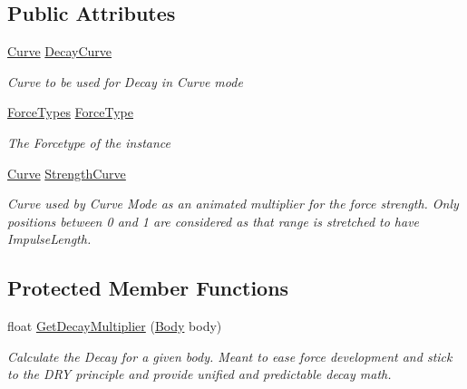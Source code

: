 \subsection*{Public Attributes}
\begin{DoxyCompactItemize}
\item 
\hyperlink{class_microsoft_1_1_xna_1_1_framework_1_1_curve}{Curve} \hyperlink{class_farseer_physics_1_1_controllers_1_1_abstract_force_controller_a6008d9eb0d18504f641b93bb7490bd2b}{Decay\+Curve}
\begin{DoxyCompactList}\small\item\em Curve to be used for Decay in Curve mode \end{DoxyCompactList}\item 
\hyperlink{class_farseer_physics_1_1_controllers_1_1_abstract_force_controller_a2bff9fa57e321530b860a86672a608a1}{Force\+Types} \hyperlink{class_farseer_physics_1_1_controllers_1_1_abstract_force_controller_a107446959131dd903faffb77093d706c}{Force\+Type}
\begin{DoxyCompactList}\small\item\em The Forcetype of the instance \end{DoxyCompactList}\item 
\hyperlink{class_microsoft_1_1_xna_1_1_framework_1_1_curve}{Curve} \hyperlink{class_farseer_physics_1_1_controllers_1_1_abstract_force_controller_a809763f82438ab59503135d9ca4f13b6}{Strength\+Curve}
\begin{DoxyCompactList}\small\item\em Curve used by Curve Mode as an animated multiplier for the force strength. Only positions between 0 and 1 are considered as that range is stretched to have Impulse\+Length. \end{DoxyCompactList}\end{DoxyCompactItemize}
\subsection*{Protected Member Functions}
\begin{DoxyCompactItemize}
\item 
float \hyperlink{class_farseer_physics_1_1_controllers_1_1_abstract_force_controller_a831c6ff98fe2ad970b075fd82707f6dc}{Get\+Decay\+Multiplier} (\hyperlink{class_farseer_physics_1_1_dynamics_1_1_body}{Body} body)
\begin{DoxyCompactList}\small\item\em Calculate the Decay for a given body. Meant to ease force development and stick to the D\+R\+Y principle and provide unified and predictable decay math. \end{DoxyCompactList}\end{DoxyCompactItemize}
